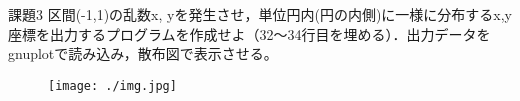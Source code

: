 \documentclass[dvipdfmx,autodetect-engine]{jsarticle}%
\begin{document}
課題3 区間(-1,1)の乱数x, yを発生させ，単位円内(円の内側)に一様に分布するx,y座標を出力するプログラムを作成せよ（32〜34行目を埋める）．出力データをgnuplotで読み込み，散布図で表示させる。

\begin{figure}[h]
  \texttt{[image: ./img.jpg]}
\end{figure}
\end{document}
